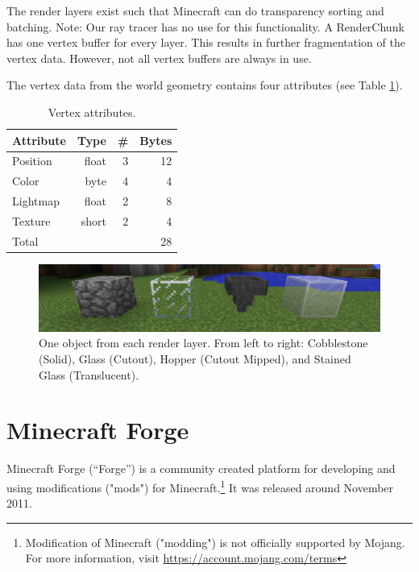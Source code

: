\documentclass[]{article}
\begin{document}
The render layers exist such that Minecraft can do transparency sorting and batching.
Note: Our ray tracer has no use for this functionality.
A RenderChunk has one vertex buffer for every layer.
This results in further fragmentation of the vertex data.
However, not all vertex buffers are always in use.

The vertex data from the world geometry contains four attributes (see Table \ref{tbl:vertex}).

\begin{table}
  \centering
  \begin{tabular}{|l|r|r|r|} \hline
    Attribute & Type & \# & Bytes\\ \hline
    Position & float & 3 & 12 \\ \hline
    Color & byte & 4 & 4 \\ \hline
    Lightmap & float & 2 & 8 \\ \hline
    Texture & short & 2 & 4 \\ \hline \hline
    \multicolumn{3}{|l|}{Total} & 28 \\ \hline
  \end{tabular}
  \caption{Vertex attributes.}
  \label{tbl:vertex}
\end{table}

\begin{figure}
  \includegraphics[width=\textwidth]{ss-layers.png}
  \centering
  \caption{One object from each render layer. From left to right: Cobblestone (Solid), Glass (Cutout), Hopper (Cutout Mipped), and Stained Glass (Translucent).}
  \label{fig:ss-layers}
\end{figure}

\section{Minecraft Forge}
Minecraft Forge (\enquote{Forge}) is a community created platform for developing and using modifications ("mods") for Minecraft.\footnote{Modification of Minecraft ("modding") is not officially supported by Mojang. For more information, visit \url{https://account.mojang.com/terms}}
It was released around November 2011.
\end{document}
